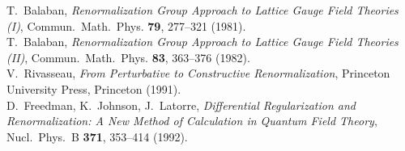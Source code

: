 \begin{thebibliography}{99}
	
	T.~Balaban,
	\textit{Renormalization Group Approach to Lattice Gauge Field Theories (I)},
	Commun.~Math.~Phys. \textbf{79}, 277--321 (1981).
	\\[-0.75em]
	
	T.~Balaban,
	\textit{Renormalization Group Approach to Lattice Gauge Field Theories (II)},
	Commun.~Math.~Phys. \textbf{83}, 363--376 (1982).
	\\[-0.75em]
	
	V.~Rivasseau,
	\textit{From Perturbative to Constructive Renormalization},
	Princeton University Press, Princeton (1991).
	\\[-0.75em]
	
	D.~Freedman, K.~Johnson, J.~Latorre, 
	\textit{Differential Regularization and Renormalization: A New Method of Calculation in Quantum Field Theory},
	Nucl.~Phys.~B \textbf{371}, 353--414 (1992).
	
\end{thebibliography}

